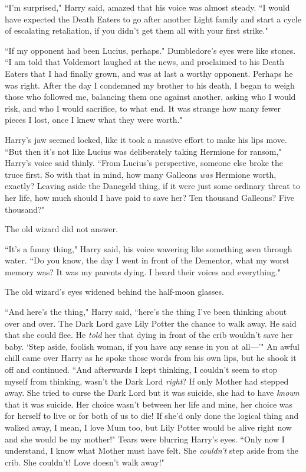 ``I'm surprised," Harry said, amazed that his voice was almost steady. ``I would have expected the Death Eaters to go after another Light family and start a cycle of escalating retaliation, if you didn't get them all with your first strike."

``If my opponent had been Lucius, perhaps." Dumbledore's eyes were like stones. ``I am told that Voldemort laughed at the news, and proclaimed to his Death Eaters that I had finally grown, and was at last a worthy opponent. Perhaps he was right. After the day I condemned my brother to his death, I began to weigh those who followed me, balancing them one against another, asking who I would risk, and who I would sacrifice, to what end. It was strange how many fewer pieces I lost, once I knew what they were worth."

Harry's jaw seemed locked, like it took a massive effort to make his lips move. ``But then it's not like Lucius was deliberately taking Hermione for ransom," Harry's voice said thinly. ``From Lucius's perspective, someone else broke the truce first. So with that in mind, how many Galleons \emph{was} Hermione worth, exactly? Leaving aside the Danegeld thing, if it were just some ordinary threat to her life, how much should I have paid to save her? Ten thousand Galleons? Five thousand?"

The old wizard did not answer.

``It's a funny thing," Harry said, his voice wavering like something seen through water. ``Do you know, the day I went in front of the Dementor, what my worst memory was? It was my parents dying. I heard their voices and everything."

The old wizard's eyes widened behind the half-moon glasses.

``And here's the thing," Harry said, ``here's the thing I've been thinking about over and over. The Dark Lord gave Lily Potter the chance to walk away. He said that she could flee. He \emph{told} her that dying in front of the crib wouldn't save her baby. `Step aside, foolish woman, if you have any sense in you at all—'{}" An awful chill came over Harry as he spoke those words from his own lips, but he shook it off and continued. ``And afterwards I kept thinking, I couldn't seem to stop myself from thinking, wasn't the Dark Lord \emph{right}? If only Mother had stepped away. She tried to curse the Dark Lord but it was suicide, she had to have \emph{known} that it was suicide. Her choice wasn't between her life and mine, her choice was for herself to live or for both of us to die! If she'd only done the logical thing and walked away, I mean, I love Mum too, but Lily Potter would be alive right now and she would be my mother!" Tears were blurring Harry's eyes. ``Only now I understand, I know what Mother must have felt. She \emph{couldn't} step aside from the crib. She couldn't! Love doesn't walk away!"

